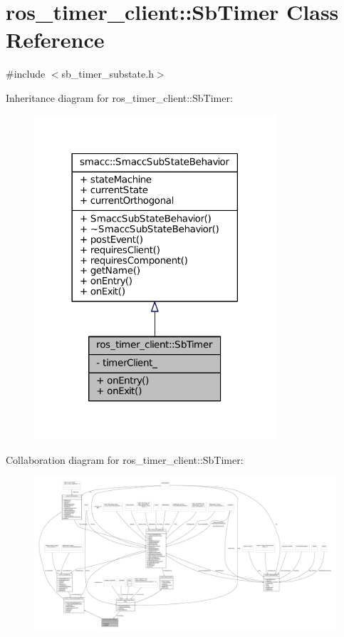 \hypertarget{classros__timer__client_1_1SbTimer}{}\section{ros\+\_\+timer\+\_\+client\+:\+:Sb\+Timer Class Reference}
\label{classros__timer__client_1_1SbTimer}


{\ttfamily \#include $<$sb\+\_\+timer\+\_\+substate.\+h$>$}



Inheritance diagram for ros\+\_\+timer\+\_\+client\+:\+:Sb\+Timer\+:
\nopagebreak
\begin{figure}[H]
\begin{center}
\leavevmode
\includegraphics[width=254pt]{classros__timer__client_1_1SbTimer__inherit__graph}
\end{center}
\end{figure}


Collaboration diagram for ros\+\_\+timer\+\_\+client\+:\+:Sb\+Timer\+:
\nopagebreak
\begin{figure}[H]
\begin{center}
\leavevmode
\includegraphics[width=350pt]{classros__timer__client_1_1SbTimer__coll__graph}
\end{center}
\end{figure}
